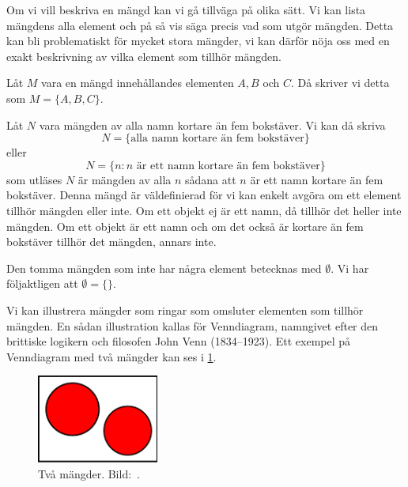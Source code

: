 Om vi vill beskriva en mängd kan vi gå tillväga på olika sätt.
Vi kan lista mängdens alla element och på så vis säga precis vad som utgör
mängden.
Detta kan bli problematiskt för mycket stora mängder, vi kan därför nöja oss
med en exakt beskrivning av vilka element som tillhör mängden.
\begin{example}\label{ExEnkelMangd}
  Låt \(M\) vara en mängd innehållandes elementen \(A,B\) och \(C\).
  Då skriver vi detta som \(M=\{A,B,C\}\).
\end{example}
\begin{example}
  Låt \(N\) vara mängden av alla namn kortare än fem bokstäver.
  Vi kan då skriva \[N=\{\text{alla namn kortare än fem bokstäver}\}\] eller
  \[N=\{n\colon n\text{ är ett namn kortare än fem bokstäver}\}\] som utläses
  \(N\) är mängden av alla \(n\) sådana att \(n\) är ett namn kortare än fem
  bokstäver.
  Denna mängd är väldefinierad för vi kan enkelt avgöra om ett element
  tillhör mängden eller inte.
  Om ett objekt ej är ett namn, då tillhör det heller inte mängden.
  Om ett objekt är ett namn och om det också är kortare än fem bokstäver
  tillhör det mängden, annars inte.
\end{example}
\begin{example}\label{ExTommaMangden}
  Den tomma mängden som inte har några element betecknas med \(\emptyset\).
  Vi har följaktligen att \(\emptyset=\{\}\).
\end{example}

Vi kan illustrera mängder som ringar som omsluter elementen som tillhör
mängden.
En sådan illustration kallas för Venndiagram, namngivet efter den brittiske 
logikern och filosofen John Venn (1834--1923).
Ett exempel på Venndiagram med två mängder kan ses i \cref{fig:Disjunkt}.
\begin{figure}
  \includegraphics[width=4cm]{figs/disjoint.pdf}
  \caption{%
    Två mängder.
    Bild:~\cite{Wikipedia2013Set}.
  }\label{fig:Disjunkt}
\end{figure}

